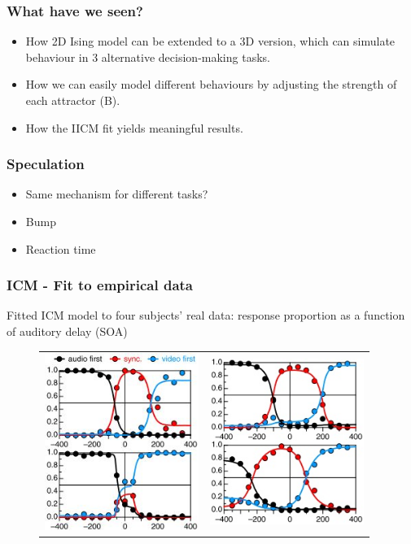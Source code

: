 \documentclass[xcolor={fixpdftex,hyperref,x11names},10pt,pdftex,hyperref={pdftex}]{beamer}
\begin{document}
\begin{frame}
  \frametitle{What have we seen?}
  \begin{itemize}
      \item How 2D Ising model can be extended to a 3D version, which can simulate behaviour in 3 alternative decision-making tasks.
      \item How we can easily model different behaviours by adjusting the strength of each attractor (B).
      \item How the IICM fit yields meaningful results.
  \end{itemize}
\end{frame}

\begin{frame}
  \frametitle{Speculation}
  \begin{itemize}
      \item Same mechanism for different tasks?
      \item Bump
      \item Reaction time
  \end{itemize}
\end{frame}

\begin{frame}
  \frametitle{ICM - Fit to empirical data}
  Fitted ICM model to four subjects' real data: response proportion
  as a function of auditory delay (SOA)
   \begin{figure}[h]
      \begin{tabular}{c c}
      \includegraphics[width=50mm]{figs/SJ3_Figure4a.jpg}
      &
      \includegraphics[width=50mm]{figs/SJ3_Figure4b.jpg}
       \end{tabular}
   \end{figure}
\end{frame}
\end{document}
